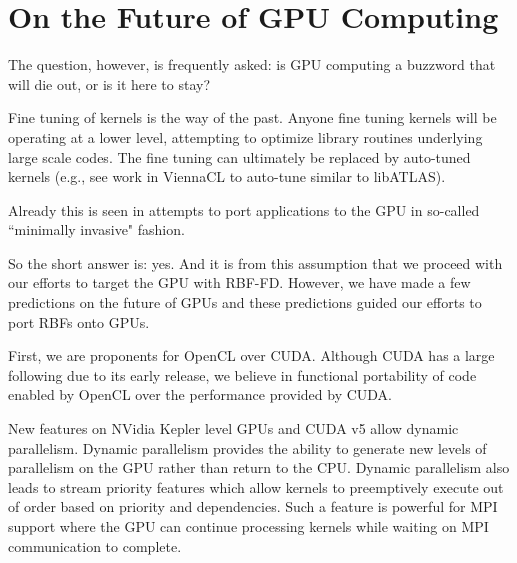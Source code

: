 \documentclass{report}
\begin{document}
\section{On the Future of GPU Computing}

The question, however, is frequently asked: is GPU computing a buzzword that will die out, or is it here to stay? 

Fine tuning of kernels is the way of the past. Anyone fine tuning kernels will be operating at a lower level, attempting to optimize library routines underlying large scale codes. The fine tuning can ultimately be replaced by auto-tuned kernels (e.g., see work in ViennaCL to auto-tune similar to libATLAS). 

Already this is seen in attempts to port applications to the GPU in so-called ``minimally invasive" fashion. 

So the short answer is: yes. And it is from this assumption that we proceed with our efforts to target the GPU with RBF-FD. However, we have made a few predictions on the future of GPUs and these predictions guided our efforts to port RBFs onto GPUs. 

First, we are proponents for OpenCL over CUDA. Although CUDA has a large following due to its early release, we believe in functional portability of code enabled by OpenCL over the performance provided by CUDA. 

New features on NVidia Kepler level GPUs and CUDA v5 allow dynamic parallelism. Dynamic parallelism provides the ability to generate new levels of parallelism on the GPU rather than return to the CPU.  Dynamic parallelism also leads to stream priority features which allow kernels to preemptively execute out of order based on priority and dependencies. Such a feature is powerful for MPI support where the GPU can continue processing kernels while waiting on MPI communication to complete. 



\ifstandalone


\end{document}
